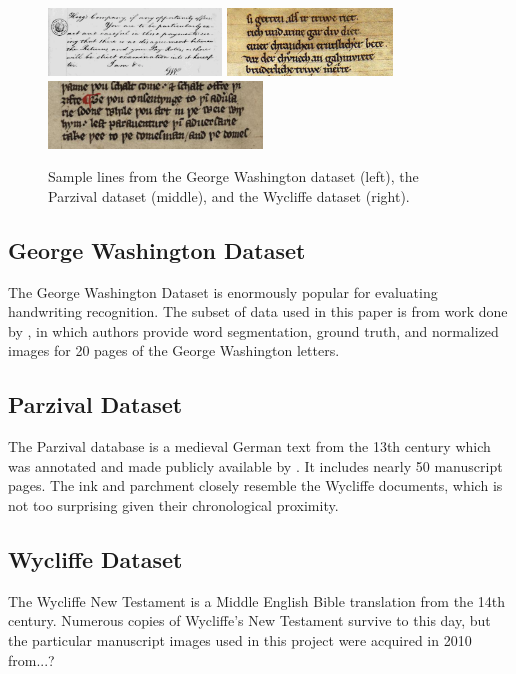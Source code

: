 \documentclass[final]{ukthesis}
\begin{document}
\begin{figure}[t]
\begin{center}
\includegraphics[height=1.8cm]{gw-sample}
\includegraphics[height=1.8cm]{parzival-sample}
\includegraphics[height=1.8cm]{wycliffe-sample}
\end{center}
\caption{Sample lines from the George Washington dataset (left), the Parzival dataset (middle), and the Wycliffe dataset (right).}
\label{fig:dataset-samples}
\end{figure}


\subsection{George Washington Dataset}
The George Washington Dataset is enormously popular for evaluating handwriting recognition. The subset of data used in this paper is from work done by \cite{fischer2012lexicon}, in which authors provide word segmentation, ground truth, and normalized images for 20 pages of the George Washington letters.

\subsection{Parzival Dataset}
The Parzival database is a medieval German text from the 13th century which was annotated and made publicly available by \cite{fischer2010ground}. It includes nearly 50 manuscript pages. The ink and parchment closely resemble the Wycliffe documents, which is not too surprising given their chronological proximity.

\subsection{Wycliffe Dataset}
The Wycliffe New Testament is a Middle English Bible translation from the 14th century. Numerous copies of Wycliffe's New Testament survive to this day, but the particular manuscript images used in this project were acquired in 2010 from...?
\end{document}
